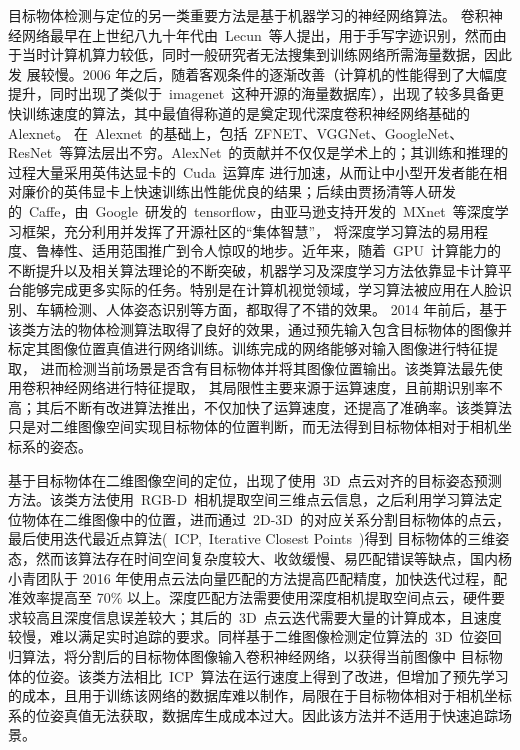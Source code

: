 目标物体检测与定位的另一类重要方法是基于机器学习的神经网络算法。
卷积神经网络最早在上世纪八九十年代由~Lecun~等人提出\cite{LecunHandwrittenDigitRecognition1990}，用于手写字迹识别，然而由于当时计算机算力较低，同时一般研究者无法搜集到训练网络所需海量数据，因此发
展较慢。2006 年之后，随着客观条件的逐渐改善（计算机的性能得到了大幅度提升，同时出现了类似于~imagenet~这种开源的海量数据库），出现了较多具备更快训练速度的算法，其中最值得称道的是奠定现代深度卷积神经网络基础的Alexnet\cite{RussakovskyImagenetLargeScale2015}。
在~Alexnet~的基础上，包括~ZFNET、VGGNet、GoogleNet、ResNet~等算法层出不穷。AlexNet~的贡献并不仅仅是学术上的；其训练和推理的过程大量采用英伟达显卡的~Cuda~运算库
进行加速，从而让中小型开发者能在相对廉价的英伟显卡上快速训练出性能优良的结果；后续由贾扬清等人研发的~Caffe，由~Google~研发的~tensorflow，由亚马逊支持开发的~MXnet~等深度学习框架，充分利用并发挥了开源社区的“集体智慧”，
将深度学习算法的易用程度、鲁棒性、适用范围推广到令人惊叹的地步。近年来，随着~GPU~计算能力的不断提升以及相关算法理论的不断突破，机器学习及深度学习方法依靠显卡计算平台能够完成更多实际的任务。特别是在计算机视觉领域，学习算法被应用在人脸识别、车辆检测、人体姿态识别等方面，都取得了不错的效果。
2014 年前后，基于该类方法的物体检测算法取得了良好的效果\cite{GirshickRichFeatureHierarchies2014,HeSpatialPyramidPooling2014,GaochangxinJiYuShenDuXueXiDeGaoFenBianLuYaoGanYingXiangMuBiaoJianCe2014}，通过预先输入包含目标物体的图像并标定其图像位置真值进行网络训练。训练完成的网络能够对输入图像进行特征提取，
进而检测当前场景是否含有目标物体并将其图像位置输出。该类算法最先使用卷积神经网络进行特征提取，
其局限性主要来源于运算速度，且前期识别率不高；其后不断有改进算法推出，不仅加快了运算速度，还提高了准确率\cite{RenFasterRcnnRealtime2015,RedmonYouOnlyLook2016}。该类算法只是对二维图像空间实现目标物体的位置判断，而无法得到目标物体相对于相机坐标系的姿态。

基于目标物体在二维图像空间的定位，出现了使用~3D~点云对齐的目标姿态预测方法。该类方法使用~RGB-D~相机提取空间三维点云信息，之后利用学习算法定位物体在二维图像中的位置，进而通过~2D-3D~的对应关系分割目标物体的点云，最后使用迭代最近点算法(~ICP,~Iterative Closest Points~)得到
目标物体的三维姿态\cite{ParkFastAutomaticObject2010,HinterstoisserModelBasedTraining2012,GuwenhuaJiYuICPPiPeiSuanFaDeShiNeiYiDongJiQiRenDingWei2013}，然而该算法存在时间空间复杂度较大、收敛缓慢、易匹配错误等缺点，国内杨小青团队于 2016 年使用点云法向量匹配的方法提高匹配精度，加快迭代过程，配准效率提高至 70\% 以上\cite{YangJiYuFaXiangLiangGaiJinDeICPSuanFa2016}。深度匹配方法需要使用深度相机提取空间点云，硬件要求较高且深度信息误差较大；其后的~3D~点云迭代需要大量的计算成本，且速度较慢，难以满足实时追踪的要求。同样基于二维图像检测定位算法的~3D~位姿回归算法，将分割后的目标物体图像输入卷积神经网络，以获得当前图像中
目标物体的位姿\cite{BrachmannLearning6dObject2014,TejaniLatentclassHoughForests2014,KehlDeepLearningLocal2016,Mousavian3dBoundingBox2017,PoirsonFastSingleShot2016}。该类方法相比~ICP~算法在运行速度上得到了改进，但增加了预先学习的成本，且用于训练该网络的数据库难以制作，局限在于目标物体相对于相机坐标系的位姿真值无法获取，数据库生成成本过大。因此该方法并不适用于快速追踪场景。

